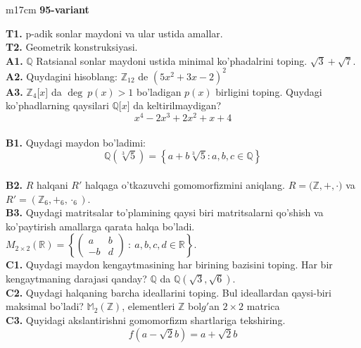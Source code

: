 \documentclass{article}
\begin{document}
\begin{tabular}{m{17cm}}
\textbf{95-variant}
\newline

\textbf{T1.} p-adik sonlar maydoni va ular ustida amallar. \\
\textbf{T2.} Geometrik konstruksiyasi. \\
\textbf{A1.} \(\mathbb{Q}\) Ratsianal sonlar maydoni ustida minimal ko'phadalrini toping.
\(\sqrt{3} + \sqrt{7}\). \\
\textbf{A2.} Quydagini hisoblang:
\(\mathbb{Z}_{12}\) de \(\left( 5x^{2} + 3x - 2 \right)^{2}\) \\
\textbf{A3.} \(\mathbb{Z}_{4}\lbrack x\rbrack\) da \(\deg\ p(x) > 1\) bo'ladigan \(p(x)\) birligini toping. Quydagi ko'phadlarning qaysilari \(\mathbb{Q\lbrack}x\rbrack\) da keltirilmaydigan?
\[x^{4} - 2x^{3} + 2x^{2} + x + 4\] \\
\textbf{B1.} Quydagi maydon bo'ladimi:
\[\mathbb{Q}\left( \sqrt[3]{5} \right) = \left\{ a + b\sqrt[3]{5}:a,b,c \in \mathbb{Q} \right\}\] \\
\textbf{B2.} \(R\) halqani \(R'\) halqaga o'tkazuvchi gomomorfizmini aniqlang.
\(R\mathbb{= (Z,} + , \cdot )\) va \(R' = (\mathbb{Z}_{6}, +_{6}, \cdot_{6})\). \\
\textbf{B3.} Quydagi matritsalar to'plamining qaysi biri matritsalarni qo'shish va ko'paytirish amallarga qarata halqa bo'ladi.
\(M_{2 \times 2}\mathbb{(R) =}\left\{ \begin{pmatrix}
a & b \\
 - b & d
\end{pmatrix}\ :\ a,b,c,d \in \mathbb{R} \right\}\). \\
\textbf{C1.} Quydagi maydon kengaytmasining har birining bazisini toping. Har bir kengaytmaning darajasi qanday?
\(\mathbb{Q}\) da \(\mathbb{Q}\left( \sqrt{3},\sqrt{6} \right)\). \\
\textbf{C2.} Quydagi halqaning barcha ideallarini toping. Bul ideallardan qaysi-biri maksimal bo'ladi?
\(\mathbb{M}_{2}\left( \mathbb{Z} \right)\), elementleri \(\mathbb{Z}\) bol\(g'\)an \(2 \times 2\) matrica \\
\textbf{C3.} Quyidagi akslantirishni gomomorfizm shartlariga tekshiring.
\[f\left( a - \sqrt{2}b \right) = a + \sqrt{2}b\] \\

\end{tabular}
\vspace{1cm}
\end{document}
